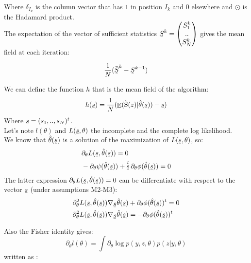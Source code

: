 \documentclass{article}
\theoremstyle{plain}
\DeclareMathOperator*{\E}{\mathbb{E}}
\DeclareMathOperator*{\St}{\tilde{S}}
\DeclareMathOperator*{\s}{\barbelow{s}}
\theoremstyle{plain}
\theoremstyle{definition}
\newcommand\barbelow[1]{\stackunder[1.2pt]{$#1$}{\rule{.8ex}{.075ex}}}
\begin{document}
\begin{appendices}
Where $\delta_{I_k}$ is the column vector that has $1$ in position $I_k$ and $0$ elsewhere and $\odot$ is the Hadamard product.\\
\noindent The expectation of the vector of sufficient statistics $\barbelow{S}^k = \begin{pmatrix}  
S_1^k\\
..\\
S_N^k\\
\end{pmatrix}$ gives the mean field at each iteration:

\begin{equation}
\frac{1}{N}(\bar{\barbelow{S}}^k - \barbelow{S}^{k-1})
\end{equation}

We can define the function $h$ that is the mean field of the algorithm:
\begin{equation}
h(\s) = \frac{1}{N}(\E(\St(z)|\hat{\theta}(\barbelow{s}))-\s)
\end{equation}
Where $\s = (s_1,..,s_N)^t$.\\
Let's note $l(\theta)$ and $L(\s,\theta)$ the incomplete and the complete log likelihood.\\
We know that $\hat{\theta}(\s)$ is a solution of the maximization of $L(\s,\theta)$, so:
\begin{equation}
\begin{split}
&\partial_{\theta}L(\s,\hat{\theta}(\s)) = 0\\
&-\partial_{\theta}\psi(\hat{\theta}(\s)) +\s^t \partial_{\theta}\phi(\hat{\theta}(\s)) = 0\\
\end{split}
\end{equation}
The latter expression $\partial_{\theta}L(\s,\hat{\theta}(\s)) = 0 $ can be differentiate with respect to the vector $\s$ (under assumptions M2-M3):
\begin{equation}
\begin{split} 
& \partial^2_{\theta}L(\s,\hat{\theta}(\s))\nabla_{\s}\hat{\theta}(\s) + \partial_{\theta}\phi(\hat{\theta}(\s))^t = 0\\
& \partial^2_{\theta}L(\s,\hat{\theta}(\s))\nabla_{\s}\hat{\theta}(\s) = -\partial_{\theta}\phi(\hat{\theta}(\s))^t
\end{split}
\end{equation}

Also the Fisher identity gives:
\begin{equation}
\partial_{\theta} l(\theta) = \int \partial_{\theta} \log p(y,z,\theta) p(z|y,\theta)
\end{equation}
written as :


\end{appendices}
\end{document}
